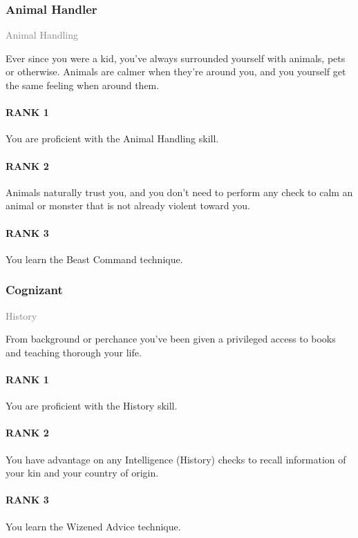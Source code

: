 \subsubsection{Animal Handler} \label{feat::animalhandler}
\small{\textcolor{gray}{Animal Handling}}

\normalsize
Ever since you were a kid, you've always surrounded yourself with animals, pets or otherwise.
Animals are calmer when they're around you, and you yourself get the same feeling when around them.
\paragraph{RANK 1} You are proficient with the Animal Handling skill.
\paragraph{RANK 2} Animals naturally trust you, and you don't need to perform any check to calm an animal or monster that is not already violent toward you.
\paragraph{RANK 3} You learn the Beast Command technique.



\subsubsection{Cognizant} \label{feat::cognizant}
\small{\textcolor{gray}{History}}

\normalsize
From background or perchance you've been given a privileged access to books and teaching thorough your life.
\paragraph{RANK 1} You are proficient with the History skill.
\paragraph{RANK 2} You have advantage on any Intelligence (History) checks to recall information of your kin and your country of origin.
\paragraph{RANK 3} You learn the Wizened Advice technique.

